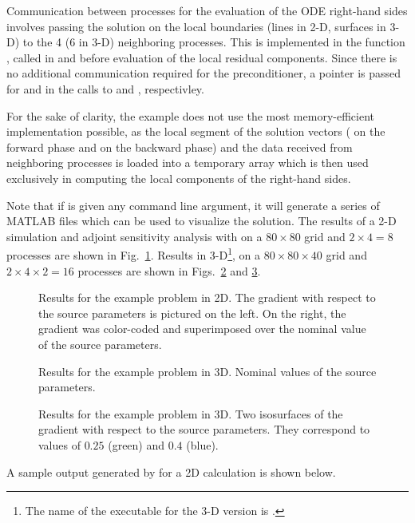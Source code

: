Communication between processes for the evaluation of the ODE right-hand sides involves
passing the solution on the local boundaries (lines in 2-D, surfaces in 3-D) to 
the 4 (6 in 3-D) neighboring processes. This is implemented in the function 
, called in  and  before evaluation of the local residual 
components. Since there is no additional communication required for the {\cvbbdpre}
preconditioner, a  pointer is passed for  and  in the
calls to  and , respectivley.

For the sake of clarity, the  example does not use
the most memory-efficient implementation possible, as the local segment of the 
solution vectors ( on the forward phase and  on the backward phase)
and the data received from neighboring processes is loaded into a temporary 
array  which is then used exclusively in computing the local components
of the right-hand sides.

Note that if  is given any command line argument,
it will generate a series of MATLAB files which can be used to visualize the solution.
The results of a 2-D simulation and adjoint sensitivity analysis with
 on a $80 \times 80$ grid and $2 \times 4 = 8$
processes are shown in Fig.~\ref{f:cvsAtmDisp_ASAi_kry_bbd_p2D}.
Results in 3-D\footnote{The name of the executable for the 3-D version is
.},  on a $80 \times 80 \times 40$ grid and 
$2 \times 4 \times 2= 16$ processes are shown in 
Figs.~\ref{f:cvsAtmDisp_ASAi_kry_bbd_p3D_a} and \ref{f:cvsAtmDisp_ASAi_kry_bbd_p3D_b}.
\begin{figure}
  {\centerline{}}
  \caption{Results for the  example problem in 2D. 
    The gradient with respect to the source parameters is pictured on the left. 
    On the right, the gradient was color-coded and superimposed over the nominal value 
    of the source parameters.}
  \label{f:cvsAtmDisp_ASAi_kry_bbd_p2D}
\end{figure}
\begin{figure}
  {\centerline{}}
  \caption{Results for the  example problem in 3D.
  Nominal values of the source parameters.}\label{f:cvsAtmDisp_ASAi_kry_bbd_p3D_a}
\end{figure}
\begin{figure}
  {\centerline{}}
  \caption{Results for the  example problem in 3D.
  Two isosurfaces of the gradient with respect to the source parameters. They correspond
  to values of $0.25$ (green) and $0.4$ (blue).}\label{f:cvsAtmDisp_ASAi_kry_bbd_p3D_b}  
\end{figure}
A sample output generated by  for a 2D calculation
is shown below.


